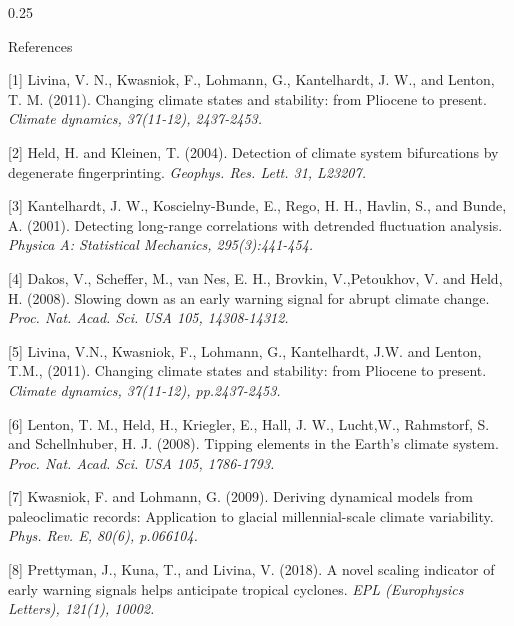 \documentclass[10pt, final]{beamer}
\begin{document}
\begin{frame}{}
\begin{columns}[T]
\begin{column}{0.25\textwidth}
    			
   		
   			
   			\begin{block}{References}
    			        {
        
 [1] Livina, V. N., Kwasniok, F., Lohmann, G., Kantelhardt, J. W., and Lenton, T. M. (2011). Changing climate states and stability: from Pliocene to present. {\it \footnotesize Climate dynamics, 37(11-12), 2437-2453.}
        
        [2] Held, H. and Kleinen, T. (2004). Detection of climate system bifurcations by degenerate fingerprinting. {\it \footnotesize Geophys. Res. Lett. 31, L23207.}
            
        [3] Kantelhardt, J. W., Koscielny-Bunde, E., Rego, H. H., Havlin, S., and Bunde, A. (2001). Detecting long-range correlations with detrended fluctuation analysis. {\it \footnotesize Physica A: Statistical Mechanics, 295(3):441-454.}            
            
        [4]  Dakos, V., Scheffer, M., van Nes, E. H., Brovkin, V.,Petoukhov, V. and Held, H. (2008). Slowing down as an early warning signal for abrupt climate change. {\it \footnotesize Proc. Nat. Acad. Sci. USA 105, 14308-14312.}
        
        [5] Livina, V.N., Kwasniok, F., Lohmann, G., Kantelhardt, J.W. and Lenton, T.M., (2011). Changing climate states and stability: from Pliocene to present. {\it \footnotesize Climate dynamics, 37(11-12), pp.2437-2453.}
        
        [6] Lenton, T. M., Held, H., Kriegler, E., Hall, J. W., Lucht,W., Rahmstorf, S. and Schellnhuber, H. J. (2008). Tipping elements in the Earth's climate system. {\it \footnotesize Proc. Nat. Acad. Sci. USA 105, 1786-1793.}  
        
        [7] Kwasniok, F. and Lohmann, G. (2009). Deriving dynamical models from paleoclimatic records: Application to glacial millennial-scale climate variability. {\it \footnotesize Phys. Rev. E, 80(6), p.066104.}
        
        [8] Prettyman, J., Kuna, T., and Livina, V. (2018). A novel scaling indicator of early warning signals helps anticipate tropical cyclones. {\it \footnotesize EPL (Europhysics Letters), 121(1), 10002.}
            
            
            
        }
    			\end{block}
   		\end{column} 
   	
   	\end{columns}
   	
   	
   	
   	
   	
   	
   	
   	
   	
   	
    	


	 	
\end{frame}
\end{document}

